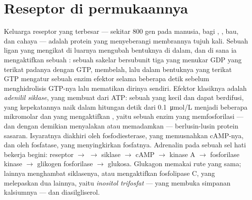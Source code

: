 \section{Reseptor di permukaannya}

\begin{proposition}\label{prop:b2:cell-signalling:gpcr}
%
Keluarga reseptor yang terbesar --- sekitar \num{800} gen pada manusia,
bagi , , bau, dan cahaya --- adalah protein yang
menyeberangi membrannya tujuh kali. Sebuah ligan yang mengikat di
luarnya mengubah bentuknya di dalam, dan di sana ia mengaktifkan sebuah
\emph{}: sebuah sakelar bersubunit tiga yang menukar GDP yang
terikat padanya dengan GTP, membelah, lalu dalam bentuknya yang terikat
GTP mengatur sebuah enzim efektor selama beberapa detik sebelum
menghidrolisis GTP-nya lalu mematikan dirinya sendiri. Efektor
klasiknya adalah \emph{adenilil siklase}, yang membuat \emph{} dari ATP: sebuah \emph{} yang kecil dan dapat
berdifusi, yang kepekatannya naik dalam hitungan detik dari
\qty{0.1}{\micro mol/L} menjadi beberapa mikromolar dan yang
mengaktifkan \emph{}, yaitu sebuah enzim yang
memfosforilasi --- dan dengan demikian menyalakan atau memadamkan ---
berlusin-lusin protein sasaran. Isyaratnya diakhiri oleh
fosfodiesterase, yang memusnahkan cAMP-nya, dan oleh fosfatase, yang
menyingkirkan fosfatnya. Adrenalin pada sebuah sel hati bekerja begini:
reseptor $\to$  $\to$ siklase $\to$ cAMP $\to$ kinase A $\to$
fosforilase kinase $\to$ glikogen fosforilase $\to$ glukosa. Glukagon
memakai rute yang sama;  lainnya menghambat siklasenya, atau
mengaktifkan fosfolipase C, yang melepaskan dua  lainnya,
yaitu \emph{inositol trifosfat} --- yang membuka simpanan kalsiumnya
--- dan diasilgliserol.
\end{proposition}
